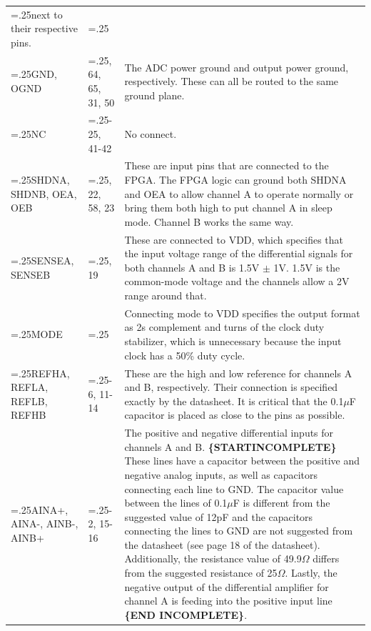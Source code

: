 \begin{tabularx}{\textwidth}{>{\hsize=.25\hsize} X >{\hsize=.25\hsize} XX}
        next to their respective pins. \\
        GND, OGND & 17, 64, 65, 31, 50 & The ADC power ground and output power ground, respectively. These
        can all be routed to the same ground plane. \\
        NC & 24-25, 41-42 & No connect. \\
        SHDNA, SHDNB, OEA, OEB & 59, 22, 58, 23 & These are input pins that are connected to the FPGA. The
        FPGA logic can ground both SHDNA and OEA to allow channel A to operate normally or bring them both
        high to put channel A in sleep mode. Channel B works the same
        way. \\
        SENSEA, SENSEB & 62, 19 & These are connected to VDD, which specifies that the input voltage range
        of the differential signals for both channels A and B is 1.5V $\pm$ 1V. 1.5V is the common-mode
        voltage and the channels allow a 2V range
        around that. \\
        MODE & 60 & Connecting mode to VDD specifies the output format as 2s complement and turns of the
        clock duty stabilizer, which is unnecessary because the input clock has a 50\% duty
        cycle. \\
        REFHA, REFLA, REFLB, REFHB & 3-6, 11-14 & These are the high and low reference for channels A and
        B, respectively. Their connection is specified exactly by the datasheet. It is critical that the
        0.1$\mu$F
        capacitor is placed as close to the pins as possible. \\
        AINA+, AINA-, AINB-, AINB+ & 1-2, 15-16 & The positive and negative differential inputs for
        channels A and B. \textbf{\{STARTINCOMPLETE\}} These lines have a capacitor between the positive
        and negative analog inputs, as well as capacitors connecting each line to GND. The capacitor value
        between the lines of 0.1$\mu$F is different from the suggested value of 12pF and the capacitors
        connecting the lines to GND are not suggested from the datasheet (see page 18 of the
        datasheet). Additionally, the resistance value of 49.9$\Omega$ differs from the suggested
        resistance of 25$\Omega$. Lastly, the negative output of the differential amplifier for channel A
        is feeding into the
        positive input line \textbf{\{END INCOMPLETE\}}. \\

        \bottomrule
\end{tabularx}


